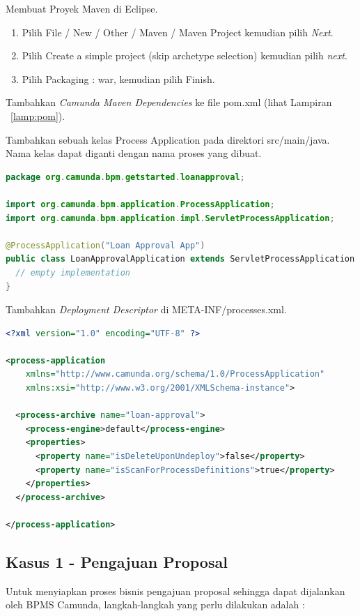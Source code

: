 \begin{description}
	\item Membuat Proyek Maven di Eclipse. 
		\begin{enumerate}
			\item Pilih File / New / Other / Maven / Maven Project kemudian pilih \textit{Next}.
			\item Pilih Create a simple project (skip archetype selection) kemudian pilih \textit{next}.
			\item Pilih Packaging : war, kemudian pilih Finish.
		\end{enumerate}
	\item Tambahkan \textit{Camunda Maven Dependencies} ke file pom.xml (lihat Lampiran ~\ref{lamp:pom}).
	\item Tambahkan sebuah kelas Process Application pada direktori src/main/java. Nama kelas dapat diganti dengan nama proses yang dibuat. 
	\begin{lstlisting}[language=java,basicstyle=\tiny,caption=Kelas Process Application]
	package org.camunda.bpm.getstarted.loanapproval;

import org.camunda.bpm.application.ProcessApplication;
import org.camunda.bpm.application.impl.ServletProcessApplication;

@ProcessApplication("Loan Approval App")
public class LoanApprovalApplication extends ServletProcessApplication {
  // empty implementation
}
	\end{lstlisting}
	\item Tambahkan \textit{Deployment Descriptor} di META-INF/processes.xml.
	
	\begin{lstlisting}[language=xml,basicstyle=\tiny,caption=processes.xml]	
	<?xml version="1.0" encoding="UTF-8" ?>

<process-application
    xmlns="http://www.camunda.org/schema/1.0/ProcessApplication"
    xmlns:xsi="http://www.w3.org/2001/XMLSchema-instance">

  <process-archive name="loan-approval">
    <process-engine>default</process-engine>
    <properties>
      <property name="isDeleteUponUndeploy">false</property>
      <property name="isScanForProcessDefinitions">true</property>
    </properties>
  </process-archive>

</process-application>
	\end{lstlisting}
	
	
\end{description}

\subsection{Kasus 1 - Pengajuan Proposal}
\label{hasilstudi_bpms_kasus1}
Untuk menyiapkan proses bisnis pengajuan proposal sehingga dapat dijalankan oleh BPMS Camunda, langkah-langkah yang perlu dilakukan adalah :

